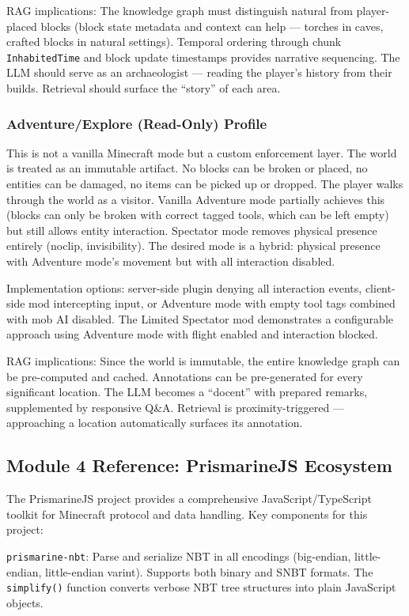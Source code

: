 \documentclass[11pt,letterpaper]{article}
\begin{document}
RAG implications: The knowledge graph must distinguish natural from player-placed blocks (block state metadata and context can help --- torches in caves, crafted blocks in natural settings). Temporal ordering through chunk \texttt{InhabitedTime} and block update timestamps provides narrative sequencing. The LLM should serve as an archaeologist --- reading the player's history from their builds. Retrieval should surface the ``story'' of each area.

\subsubsection{Adventure/Explore (Read-Only) Profile}
This is not a vanilla Minecraft mode but a custom enforcement layer. The world is treated as an immutable artifact. No blocks can be broken or placed, no entities can be damaged, no items can be picked up or dropped. The player walks through the world as a visitor. Vanilla Adventure mode partially achieves this (blocks can only be broken with correct tagged tools, which can be left empty) but still allows entity interaction. Spectator mode removes physical presence entirely (noclip, invisibility). The desired mode is a hybrid: physical presence with Adventure mode's movement but with all interaction disabled.

Implementation options: server-side plugin denying all interaction events, client-side mod intercepting input, or Adventure mode with empty tool tags combined with mob AI disabled. The Limited Spectator mod demonstrates a configurable approach using Adventure mode with flight enabled and interaction blocked.

RAG implications: Since the world is immutable, the entire knowledge graph can be pre-computed and cached. Annotations can be pre-generated for every significant location. The LLM becomes a ``docent'' with prepared remarks, supplemented by responsive Q\&A. Retrieval is proximity-triggered --- approaching a location automatically surfaces its annotation.

\subsection{Module 4 Reference: PrismarineJS Ecosystem}

The PrismarineJS project provides a comprehensive JavaScript/TypeScript toolkit for Minecraft protocol and data handling. Key components for this project:

\texttt{prismarine-nbt}: Parse and serialize NBT in all encodings (big-endian, little-endian, little-endian varint). Supports both binary and SNBT formats. The \texttt{simplify()} function converts verbose NBT tree structures into plain JavaScript objects.
\end{document}
